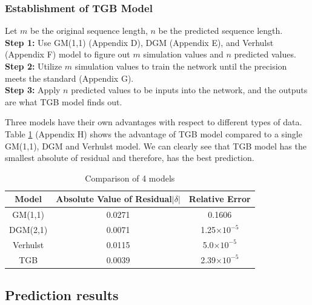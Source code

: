 \subsubsection{Establishment of TGB Model}

Let $m$ be the original sequence length, $n$ be the predicted sequence length.\\
\textbf{Step 1:} Use GM(1,1) (Appendix D), DGM (Appendix E), and Verhulst (Appendix F) model to figure out $m$ simulation values and $n$ predicted values.\\
\textbf{Step 2:} Utilize $m$ simulation values to train the network until the precision meets the standard (Appendix G).\\
\textbf{Step 3:} Apply $n$ predicted values to be inputs into the network, and the outputs are what TGB model finds out.

Three models have their own advantages with respect to different types of data. Table \ref{comparison} (Appendix H) shows the advantage of TGB model compared to a single GM(1,1), DGM and Verhulst model. We can clearly see that TGB model has the smallest absolute of residual and therefore, has the best prediction.
\begin{table}[!htbp]
\centering\caption{Comparison of 4 models}
\begin{tabular}{c|c|c}
  \hline
  Model & Absolute Value of Residual$|\delta|$ & Relative Error \\
  \hline
  GM(1,1) & 0.0271 & 0.1606 \\
  DGM(2,1) & 0.0071 & 1.25$\times 10^{-5}$ \\
  Verhulst & 0.0115 & 5.0$\times 10^{-5}$ \\
  TGB & 0.0039 & 2.39$\times 10^{-5}$ \\
  \hline
\end{tabular}\label{comparison}
\end{table}

\subsection{Prediction results}

